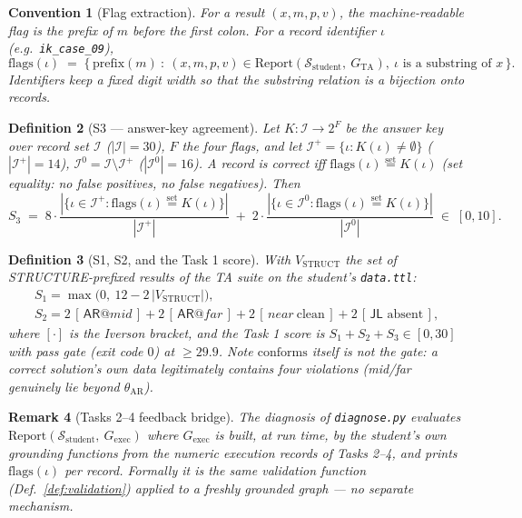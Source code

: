 \documentclass[11pt,a4paper]{article}
\newtheorem{definition}{Definition}[section]
\newtheorem{remark}[definition]{Remark}
\newtheorem{convention}[definition]{Convention}
\newcommand{\graph}{G}
\newcommand{\shapes}{\mathcal{S}}
\newcommand{\flags}{\mathrm{flags}}
\newcommand{\seteq}{\stackrel{\text{set}}{=}}
\begin{document}
\begin{convention}[Flag extraction]\label{conv:flag}
For a result $(x, m, p, v)$, the machine-readable flag is the prefix of $m$
before the first colon. For a record identifier $\iota$ (e.g.\
\texttt{ik\_case\_09}),
\[
  \flags(\iota) \;=\; \{\, \mathrm{prefix}(m) \ :\ (x,m,p,v) \in
  \mathrm{Report}(\shapes_{\mathrm{student}},\ \graph_{\mathrm{TA}}),\
  \iota \text{ is a substring of } x \,\}.
\]
Identifiers keep a fixed digit width so that the substring relation is a
bijection onto records.
\end{convention}

\begin{definition}[S3 --- answer-key agreement]
Let $K : \mathcal{I} \to 2^{F}$ be the answer key over record set
$\mathcal{I}$ ($|\mathcal{I}| = 30$), $F$ the four flags, and let
$\mathcal{I}^{+} = \{\iota : K(\iota) \ne \emptyset\}$ ($|\mathcal{I}^{+}|=14$),
$\mathcal{I}^{0} = \mathcal{I} \setminus \mathcal{I}^{+}$
($|\mathcal{I}^{0}|=16$). A record is \emph{correct} iff
$\flags(\iota) \seteq K(\iota)$ (set equality: no false positives, no false
negatives). Then
\[
  S_3 \;=\; 8 \cdot
  \frac{|\{\iota \in \mathcal{I}^{+} : \flags(\iota) \seteq K(\iota)\}|}{|\mathcal{I}^{+}|}
  \;+\; 2 \cdot
  \frac{|\{\iota \in \mathcal{I}^{0} : \flags(\iota) \seteq K(\iota)\}|}{|\mathcal{I}^{0}|}
  \;\in\; [0, 10].
\]
\end{definition}

\begin{definition}[S1, S2, and the Task 1 score]
With $V_{\mathrm{STRUCT}}$ the set of \textsf{STRUCTURE}-prefixed results of the
TA suite on the student's \texttt{data.ttl}:
\begin{gather*}
  S_1 = \max\bigl(0,\ 12 - 2\,|V_{\mathrm{STRUCT}}|\bigr), \\
  S_2 = 2\,[\,\textsf{AR}@\mathit{mid}\,] + 2\,[\,\textsf{AR}@\mathit{far}\,]
      + 2\,[\,\mathit{near}\ \text{clean}\,] + 2\,[\,\textsf{JL} \text{ absent}\,],
\end{gather*}
where $[\cdot]$ is the Iverson bracket, and the Task 1 score is
$S_1 + S_2 + S_3 \in [0,30]$ with pass gate (exit code $0$) at $\ge 29.9$.
Note $\mathrm{conforms}$ itself is \emph{not} the gate: a correct solution's own
data legitimately contains four violations (\emph{mid}/\emph{far} genuinely lie
beyond $\theta_{\mathrm{AR}}$).
\end{definition}

\begin{remark}[Tasks 2--4 feedback bridge]
The diagnosis of \texttt{diagnose.py} evaluates
$\mathrm{Report}(\shapes_{\mathrm{student}},\ \graph_{\mathrm{exec}})$ where
$\graph_{\mathrm{exec}}$ is built, at run time, by the student's own grounding
functions from the numeric execution records of Tasks 2--4, and prints
$\flags(\iota)$ per record. Formally it is the same validation function
(Def.~\ref{def:validation}) applied to a freshly grounded graph --- no separate
mechanism.
\end{remark}
\end{document}
